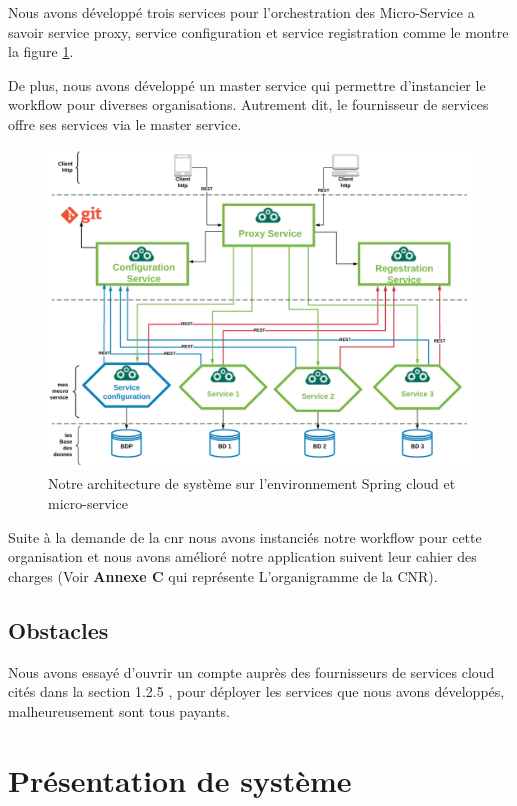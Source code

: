  
    Nous avons développé  trois services pour l'orchestration des Micro-Service a  savoir service proxy, service  configuration et service  registration comme le montre  la figure \ref{fig:cloudms}.
    
De plus, nous avons développé un master service qui permettre d'instancier le workflow pour diverses organisations.  Autrement dit, le fournisseur de services offre ses services via le master service.
 \begin{figure}[H]
 	\centering
 	\includegraphics[width=1\linewidth]{images/cloudMS}
 	\caption{Notre architecture de système sur l'environnement Spring cloud et micro-service}
 	\label{fig:cloudms}
 \end{figure}
 
     Suite à la demande de la \ac{cnr} nous avons instanciés notre workflow pour cette organisation et nous avons amélioré notre application suivent  leur  cahier des charges  (Voir \textbf{Annexe C} qui représente  L'organigramme de la CNR).  
     
          
\subsection{Obstacles}
Nous avons essayé d'ouvrir un compte auprès des fournisseurs de services cloud cités dans la section 1.2.5 , pour déployer les services que nous avons développés, malheureusement sont tous payants.
 
  
  
 \section{Présentation de système }

